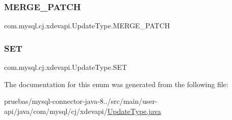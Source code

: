\subsubsection{\texorpdfstring{M\+E\+R\+G\+E\+\_\+\+P\+A\+T\+CH}{MERGE\_PATCH}}
{\footnotesize\ttfamily com.\+mysql.\+cj.\+xdevapi.\+Update\+Type.\+M\+E\+R\+G\+E\+\_\+\+P\+A\+T\+CH}

\mbox{\label{enumcom_1_1mysql_1_1cj_1_1xdevapi_1_1_update_type_a5b66ffe275997597cef8611505174045}} 
\subsubsection{\texorpdfstring{S\+ET}{SET}}
{\footnotesize\ttfamily com.\+mysql.\+cj.\+xdevapi.\+Update\+Type.\+S\+ET}



The documentation for this enum was generated from the following file\+:\begin{DoxyCompactItemize}
\item 
pruebas/mysql-\/connector-\/java-\/8../src/main/user-\/api/java/com/mysql/cj/xdevapi/\mbox{\hyperlink{_update_type_8java}{Update\+Type.\+java}}\end{DoxyCompactItemize}
